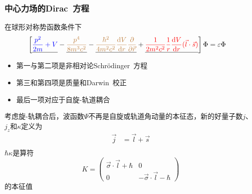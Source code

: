 \documentclass[cjk,slidestop,compress,mathserif,blue]{beamer}
\begin{document}
\frame
{
	\frametitle{中心力场的\textrm{Dirac~}方程}
	在球形对称势函数条件下
	\begin{displaymath}
		\hspace*{-10pt}\left[ \underline{\textcolor{blue}{\frac{p^2}{2m}+V}}-\underline{\textcolor{brown}{\frac{p^4}{8m^3c^2}}}-\underline{\textcolor{brown}{\frac{\hbar^2}{4m^2c^2}\frac{\mathrm{d}V}{\mathrm{d}r}\frac{\partial}{\partial\vec r}}}+\underline{\textcolor{red}{\frac1{2m^2c^2}\frac1r\frac{\mathrm{d}V}{\mathrm{d}r}(\vec l\cdot\vec s)}} \right]\Phi=\varepsilon\Phi
	\end{displaymath}
	\begin{itemize}
		\item 第一与第二项是非相对论\textrm{Schr\"odinger~}方程
		\item 第三和第四项是质量和\textrm{Darwin~}校正
		\item 最后一项对应于自旋-轨道耦合
	\end{itemize}
	考虑旋-轨耦合后，波函数$\Psi$不再是自旋或轨道角动量的本征态，新的好量子数$j$、$j_z$和$\kappa$定义为
	$$\begin{aligned}
		\vec j&=\vec l+\vec s\\
	\end{aligned}$$
	$\hbar\kappa$是算符
	\begin{displaymath}
		K=\left( 
		\begin{matrix}
			\vec{\sigma}\cdot\vec l+\hbar &0\\
			0 &-\vec{\sigma}\cdot\vec l-\hbar
		\end{matrix}
		\right)
	\end{displaymath}
	的本征值
%	
}
\end{document}
